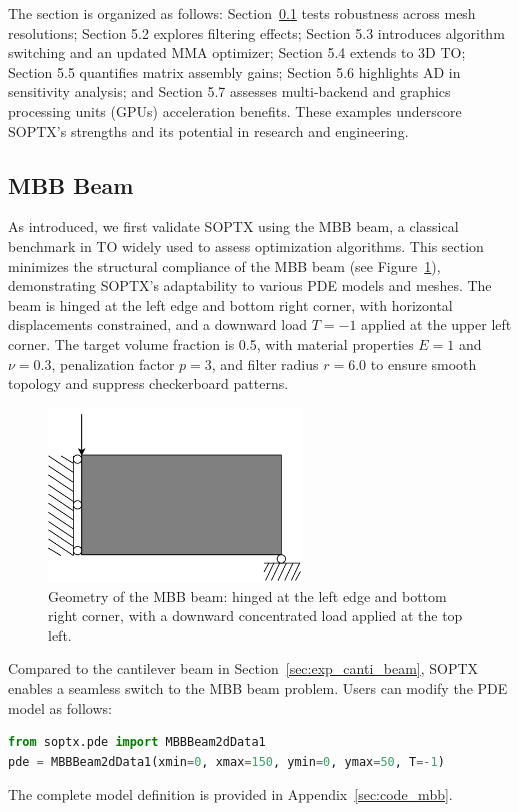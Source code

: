 \documentclass[mathpazo]{cicp}
\begin{document}
The section is organized as follows: Section~\ref{sec:exp_mbb_beam} tests robustness across mesh resolutions; Section 5.2 explores filtering effects; Section 5.3 introduces algorithm switching and an updated MMA optimizer; Section 5.4 extends to 3D TO; Section 5.5 quantifies matrix assembly gains; Section 5.6 highlights AD in sensitivity analysis; and Section 5.7 assesses multi-backend and graphics processing units (GPUs) acceleration benefits. These examples underscore SOPTX's strengths and its potential in research and engineering.

\subsection{MBB Beam}\label{sec:exp_mbb_beam}
As introduced, we first validate SOPTX using the MBB beam, a classical benchmark in TO widely used to assess optimization algorithms. This section minimizes the structural compliance of the MBB beam (see Figure~\ref{fig:mbb_beam}), demonstrating SOPTX's adaptability to various PDE models and meshes. The beam is hinged at the left edge and bottom right corner, with horizontal displacements constrained, and a downward load $T = -1$ applied at the upper left corner. The target volume fraction is 0.5, with material properties $E = 1$ and $\nu = 0.3$, penalization factor $p = 3$, and filter radius $r = 6.0$ to ensure smooth topology and suppress checkerboard patterns.
\begin{figure}[htb]
	\centering
	\includegraphics[width=0.6\textwidth]{figures/mbb_2d.png}
	\caption{Geometry of the MBB beam: hinged at the left edge and bottom right corner, with a downward concentrated load applied at the top left.}
	\label{fig:mbb_beam}
\end{figure}

Compared to the cantilever beam in Section~\ref{sec:exp_canti_beam}, SOPTX enables a seamless switch to the MBB beam problem. Users can modify the PDE model as follows:
\begin{lstlisting}[language=Python]
from soptx.pde import MBBBeam2dData1
pde = MBBBeam2dData1(xmin=0, xmax=150, ymin=0, ymax=50, T=-1)
\end{lstlisting}
The complete model definition is provided in Appendix~\ref{sec:code_mbb}.
\end{document}
